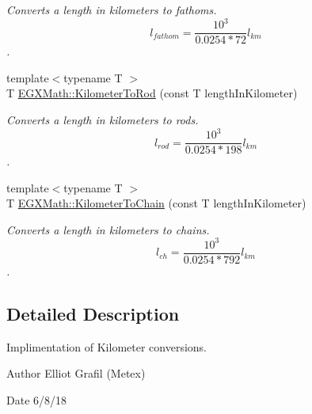 \begin{DoxyCompactItemize}
\begin{DoxyCompactList}\small\item\em Converts a length in kilometers to fathoms. \[ l_{fathom}= \frac{10^{3}}{0.0254 * 72} l_{km} \]. \end{DoxyCompactList}\item 
{\footnotesize template$<$typename T $>$ }\\T \mbox{\hyperlink{group___e_g_x_math-_conversions-_length_conversions-_s_i-_kilometer-_surveyors_gae57f6033d241f64aa645a42bfe354567}{E\+G\+X\+Math\+::\+Kilometer\+To\+Rod}} (const T length\+In\+Kilometer)
\begin{DoxyCompactList}\small\item\em Converts a length in kilometers to rods. \[ l_{rod}= \frac{10^{3}}{0.0254 * 198} l_{km} \]. \end{DoxyCompactList}\item 
{\footnotesize template$<$typename T $>$ }\\T \mbox{\hyperlink{group___e_g_x_math-_conversions-_length_conversions-_s_i-_kilometer-_surveyors_ga42dd7fe86fb9ffdbc0a82b58876f9d6d}{E\+G\+X\+Math\+::\+Kilometer\+To\+Chain}} (const T length\+In\+Kilometer)
\begin{DoxyCompactList}\small\item\em Converts a length in kilometers to chains. \[ l_{ch}= \frac{10^{3}}{0.0254 * 792} l_{km} \]. \end{DoxyCompactList}\end{DoxyCompactItemize}


\subsection{Detailed Description}
Implimentation of Kilometer conversions. 

\begin{DoxyAuthor}{Author}
Elliot Grafil (Metex) 
\end{DoxyAuthor}
\begin{DoxyDate}{Date}
6/8/18 
\end{DoxyDate}

